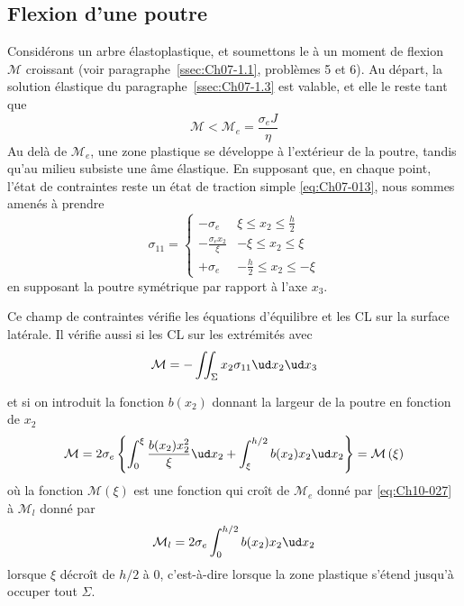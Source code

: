 \subsection{Flexion d'une poutre} \label{ssec:Ch10-2.1}
Considérons un arbre élastoplastique, et soumettons le à un moment 
de flexion $\mathcal{M}$ croissant (voir paragraphe~\ref{ssec:Ch07-1.1}, problèmes 5 et 6).
Au départ, la solution élastique du paragraphe~\ref{ssec:Ch07-1.3} est valable, et elle le reste tant que 
\begin{equation}
    \mathcal{M} < \mathcal{M}_e = \frac{\sigma_e J}{\eta}
    \label{eq:Ch10-027}
\end{equation}
Au delà de $\mathcal{M}_e$, une zone plastique se développe à l'extérieur de la poutre, tandis qu'au milieu subsiste une âme élastique.
En supposant que, en chaque point, l'état de contraintes reste un état de traction simple \eqref{eq:Ch07-013}, nous sommes amenés à prendre 
\begin{equation}
    \sigma_{11} = 
    \begin{cases}
        \displaystyle -\sigma_e & \displaystyle \xi \leq x_2 \leq  \frac{h}{2} \\
        \displaystyle -\frac{\sigma_e x_2}{\xi} & \displaystyle -\xi \leq x_2 \leq \xi \\
        \displaystyle +\sigma_e & \displaystyle -\frac{h}{2} \leq x_2 \leq -\xi
    \end{cases}
    \label{eq:Ch10-028}
\end{equation}
en supposant la poutre symétrique par rapport à l'axe $x_3$.

\begin{multicols}{2}
    Ce champ de contraintes vérifie les équations d'équilibre et les CL sur la surface latérale.
    Il vérifie aussi si les CL sur les extrémités avec
    \[
    \mathcal{M} = - \iint_{\Sigma} x_2 \sigma_{11} \ud x_2 \ud x_3
    \]
    \columnbreak
    \begin{center}
    \end{center}
\end{multicols}
et si on introduit la fonction $b\left( x_2 \right)$ donnant la largeur de la poutre en fonction de $x_2$
\begin{equation}
    \mathcal{M} = 2 \sigma_e \left\{ \int_0^{\xi} \frac{b(x_2)x_2^2}{\xi} \ud x_2 + \int_{\xi}^{h/2} b(x_2)x_2 \ud x_2 \right\} = \mathcal{M} \left( \xi \right)
    \label{eq:Ch10-029}
\end{equation}
où la fonction $\mathcal{M}(\xi)$ est une fonction qui croît de $\mathcal{M}_e$ donné par \eqref{eq:Ch10-027} à $\mathcal{M}_l$ donné par 
\begin{equation}
    \mathcal{M}_l = 2 \sigma_e \int_0^{h/2} b(x_2) x_2 \ud x_2
    \label{eq:Ch10-030}
\end{equation}
lorsque $\xi$ décroît de $h/2$ à $0$, c'est-à-dire lorsque la zone plastique s'étend jusqu'à occuper tout $\Sigma$.

